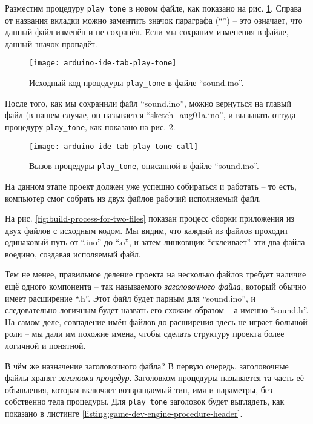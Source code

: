 \documentclass[../sparc.tex]{subfiles}
\begin{document}
Разместим процедуру \texttt{play_tone} в новом файле, как показано на
рис. \ref{fig:arduino-ide-tab-play-tone}.  Справа от названия вкладки можно
заментить значок параграфа (``\textsection'') -- это означает, что данный файл изменён и не
сохранён.  Если мы сохраним изменения в файле, данный значок пропадёт.

\begin{figure}[h]
  \centering
  \texttt{[image: arduino-ide-tab-play-tone]}
  \caption{Исходный код процедуры \texttt{play_tone} в файле ``sound.ino''.}
  \label{fig:arduino-ide-tab-play-tone}
\end{figure}

После того, как мы сохранили файл ``sound.ino'', можно вернуться на главый файл
(в нашем случае, он называется ``sketch\_aug01a.ino'', и вызывать оттуда
процедуру \texttt{play_tone}, как показано на
рис. \ref{fig:arduino-ide-tab-play-tone-call}.

\begin{figure}[h]
  \centering
  \texttt{[image: arduino-ide-tab-play-tone-call]}
  \caption{Вызов процедуры \texttt{play_tone}, описанной в файле
    ``sound.ino''.}
  \label{fig:arduino-ide-tab-play-tone-call}
\end{figure}

На данном этапе проект должен уже успешно собираться и работать -- то есть,
компьютер смог собрать из двух файлов рабочий исполняемый файл.


На рис. \ref{fig:build-process-for-two-files} показан процесс сборки приложения
из двух файлов с исходным кодом.  Мы видим, что каждый из файлов проходит
одинаковый путь от ``.ino'' до ``.o'', и затем линковщик ``склеивает'' эти два
файла воедино, создавая исполяемый файл.

Тем не менее, правильное деление проекта на несколько файлов требует наличие ещё
одного компонента -- так называемого \emph{заголовочного файла}, который обычно
имеет расширение ``.h''.  Этот файл будет парным для ``sound.ino'', и
следовательно логичным будет назвать его схожим образом -- а именно ``sound.h''.
На самом деле, совпадение имён файлов до расширения здесь не играет большой роли
-- мы дали им похожие имена, чтобы сделать структуру проекта более логичной и
понятной.

В чём же назначение заголовочного файла?  В первую очередь, заголовочные файлы
хранят \emph{заголовки процедур}.  Заголовком процедуры называется та часть её
объявления, которая включает возвращаемый тип, имя и параметры, без собственно
тела процедуры.  Для \texttt{play_tone} заголовок будет выглядеть, как
показано в листинге \ref{listing:game-dev-engine-procedure-header}.
\end{document}
